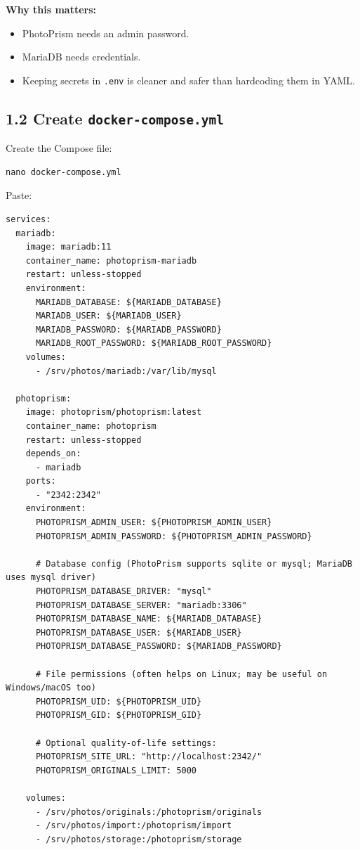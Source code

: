 \textbf{Why this matters:}
\begin{itemize}[leftmargin=*]
  \item PhotoPrism needs an admin password.
  \item MariaDB needs credentials.
  \item Keeping secrets in \texttt{.env} is cleaner and safer than hardcoding them in YAML.
\end{itemize}


\subsection{1.2 Create \texttt{docker-compose.yml}}
Create the Compose file:

\begin{lstlisting}
nano docker-compose.yml
\end{lstlisting}

Paste:

\begin{lstlisting}
services:
  mariadb:
    image: mariadb:11
    container_name: photoprism-mariadb
    restart: unless-stopped
    environment:
      MARIADB_DATABASE: ${MARIADB_DATABASE}
      MARIADB_USER: ${MARIADB_USER}
      MARIADB_PASSWORD: ${MARIADB_PASSWORD}
      MARIADB_ROOT_PASSWORD: ${MARIADB_ROOT_PASSWORD}
    volumes:
      - /srv/photos/mariadb:/var/lib/mysql

  photoprism:
    image: photoprism/photoprism:latest
    container_name: photoprism
    restart: unless-stopped
    depends_on:
      - mariadb
    ports:
      - "2342:2342"
    environment:
      PHOTOPRISM_ADMIN_USER: ${PHOTOPRISM_ADMIN_USER}
      PHOTOPRISM_ADMIN_PASSWORD: ${PHOTOPRISM_ADMIN_PASSWORD}

      # Database config (PhotoPrism supports sqlite or mysql; MariaDB uses mysql driver)
      PHOTOPRISM_DATABASE_DRIVER: "mysql"
      PHOTOPRISM_DATABASE_SERVER: "mariadb:3306"
      PHOTOPRISM_DATABASE_NAME: ${MARIADB_DATABASE}
      PHOTOPRISM_DATABASE_USER: ${MARIADB_USER}
      PHOTOPRISM_DATABASE_PASSWORD: ${MARIADB_PASSWORD}

      # File permissions (often helps on Linux; may be useful on Windows/macOS too)
      PHOTOPRISM_UID: ${PHOTOPRISM_UID}
      PHOTOPRISM_GID: ${PHOTOPRISM_GID}

      # Optional quality-of-life settings:
      PHOTOPRISM_SITE_URL: "http://localhost:2342/"
      PHOTOPRISM_ORIGINALS_LIMIT: 5000

    volumes:
      - /srv/photos/originals:/photoprism/originals
      - /srv/photos/import:/photoprism/import
      - /srv/photos/storage:/photoprism/storage
\end{lstlisting}

